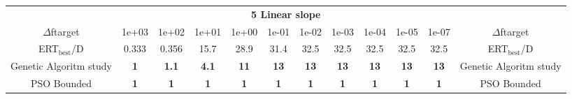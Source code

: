 \begin{tabular}{cccccccccccc}
 & \multicolumn{10}{c}{{\normalsize \textbf{5 Linear slope}}}\\
$\Delta$ftarget& 1e+03& 1e+02& 1e+01& 1e+00& 1e-01& 1e-02& 1e-03& 1e-04& 1e-05& 1e-07 & $\Delta$ftarget \\
ERT$_{\textrm{best}}$/D& 0.333& 0.356& 15.7& 28.9& 31.4& 32.5& 32.5& 32.5& 32.5& 32.5 & ERT$_{\textrm{best}}$/D \\
\hline
Genetic Algoritm study & \textbf{1} & \textbf{1.1} & \textbf{4.1} & \textbf{11} & \textbf{13} & \textbf{13} & \textbf{13} & \textbf{13} & \textbf{13} & \textbf{13} & Genetic Algoritm study \cite{add_an_entry_for_Genetic Algoritm study_in_bbob.bib}\\
PSO Bounded & \textbf{1} & \textbf{1} & \textbf{1} & \textbf{1} & \textbf{1} & \textbf{1} & \textbf{1} & \textbf{1} & \textbf{1} & \textbf{1} & PSO Bounded \cite{add_an_entry_for_PSO Bounded_in_bbob.bib}
\end{tabular}
